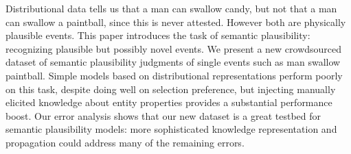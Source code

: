 Distributional data tells us that a man can swallow candy, but not that a man can swallow a paintball, since this is never attested. However both are physically plausible events. This paper introduces the task of semantic plausibility: recognizing plausible but possibly novel events. We present a new crowdsourced dataset of semantic plausibility judgments of single events such as man swallow paintball. Simple models based on distributional representations perform poorly on this task, despite doing well on selection preference, but injecting manually elicited knowledge about entity properties provides a substantial performance boost. Our error analysis shows that our new dataset is a great testbed for semantic plausibility models: more sophisticated knowledge representation and propagation could address many of the remaining errors.
